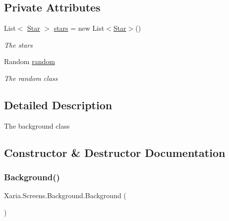 \subsection*{Private Attributes}
\begin{DoxyCompactItemize}
\item 
List$<$ \hyperlink{classXaria_1_1Projectiles_1_1Star}{Star} $>$ \hyperlink{classXaria_1_1Screens_1_1Background_a3e8a751676da0427c800c6e68a35b2d1}{stars} = new List$<$\hyperlink{classXaria_1_1Projectiles_1_1Star}{Star}$>$()
\begin{DoxyCompactList}\small\item\em The stars \end{DoxyCompactList}\item 
Random \hyperlink{classXaria_1_1Screens_1_1Background_a4b97051079197aa128807b05494efb60}{random}
\begin{DoxyCompactList}\small\item\em The random class \end{DoxyCompactList}\end{DoxyCompactItemize}


\subsection{Detailed Description}
The background class 



\subsection{Constructor \& Destructor Documentation}
\mbox{\label{classXaria_1_1Screens_1_1Background_a458fa6c55e61b678da2812d182d021a8}} 
\subsubsection{\texorpdfstring{Background()}{Background()}}
{\footnotesize\ttfamily Xaria.\+Screens.\+Background.\+Background (\begin{DoxyParamCaption}{ }\end{DoxyParamCaption})\hspace{0.3cm}{\ttfamily [inline]}}



